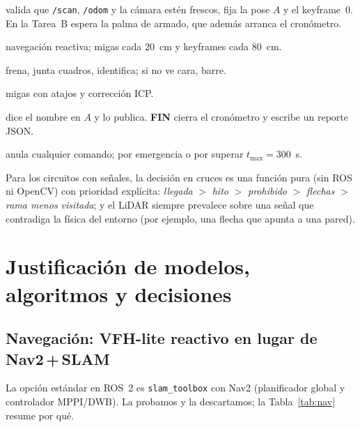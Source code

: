 \documentclass[11pt,a4paper]{article}
\newcommand{\cmd}[1]{\texttt{\small #1}}
\begin{document}
\begin{description}[nosep,leftmargin=2.3cm,style=sameline]
\item[ESPERA] valida que \cmd{/scan}, \cmd{/odom} y la c\'amara est\'en frescos, fija la pose $A$ y el keyframe~0. En la Tarea~B espera la palma de armado, que adem\'as arranca el cron\'ometro.
\item[IR\_A\_B] navegaci\'on reactiva; migas cada 20~cm y keyframes cada 80~cm.
\item[ESCANEAR] frena, junta cuadros, identifica; si no ve cara, barre.
\item[VOLVER\_A\_A] migas con atajos y correcci\'on ICP.
\item[ANUNCIAR] dice el nombre en $A$ y lo publica. \textbf{FIN} cierra el cron\'ometro y escribe un reporte JSON.
\item[PARADA] anula cualquier comando; por emergencia o por superar $t_{\max}=300$~s.
\end{description}
Para los circuitos con se\~nales, la decisi\'on en cruces es una funci\'on pura (sin ROS ni OpenCV) con prioridad expl\'icita: \emph{llegada} $>$ \emph{hito} $>$ \emph{prohibido} $>$ \emph{flechas} $>$
\emph{rama menos visitada}; y el LiDAR siempre prevalece sobre una se\~nal que contradiga la f\'isica del entorno (por ejemplo, una flecha que apunta a una pared).

\section{Justificaci\'on de modelos, algoritmos y decisiones}
\label{sec:just}
\subsection{Navegaci\'on: VFH-lite reactivo en lugar de Nav2\,+\,SLAM}
La opci\'on est\'andar en ROS~2 es \texttt{slam\_toolbox} con Nav2 (planificador global y controlador MPPI/DWB). La probamos y la descartamos; la Tabla~\ref{tab:nav} resume por qu\'e.
\end{document}
